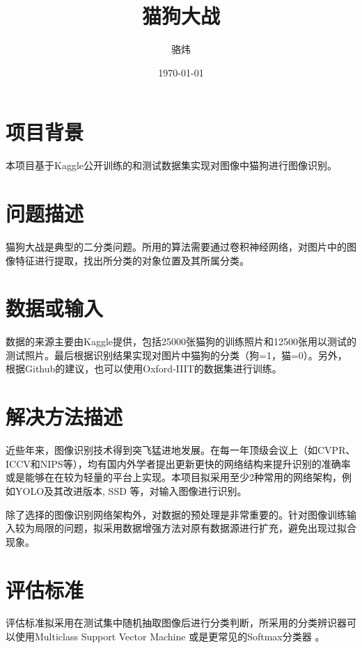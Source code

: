 \documentclass[a4paper,11pt]{article}
\author{骆炜}
\date{\today}
\title{猫狗大战}
\begin{document}
\maketitle
\tableofcontents


\section{项目背景}
\label{sec:org61c381c}
本项目基于Kaggle公开训练的和测试数据集实现对图像中猫狗进行图像识别。
\section{问题描述}
\label{sec:org3144931}
猫狗大战是典型的二分类问题。所用的算法需要通过卷积神经网络，对图片中的图像特征进行提取，找出所分类的对象位置及其所属分类。
\section{数据或输入}
\label{sec:orge54e3b4}
数据的来源主要由Kaggle提供，包括25000张猫狗的训练照片和12500张用以测试的测试照片。最后根据识别结果实现对图片中猫狗的分类（狗=1，猫=0）。另外，根据Github的建议，也可以使用Oxford-IIIT的数据集进行训练。
\section{解决方法描述}
\label{sec:org768782f}
近些年来，图像识别技术得到突飞猛进地发展。在每一年顶级会议上（如CVPR、ICCV和NIPS等），均有国内外学者提出更新更快的网络结构来提升识别的准确率或是能够在在较为轻量的平台上实现。本项目拟采用至少2种常用的网络架构，例如YOLO及其改进版本\cite{RedmonDivvalaGirshickFarhadi2016}, SSD \cite{LiuAnguelovErhanSzegedyReedFuBerg2016} 等，对输入图像进行识别。

除了选择的图像识别网络架构外，对数据的预处理是非常重要的。针对图像训练输入较为局限的问题，拟采用数据增强方法对原有数据源进行扩充，避免出现过拟合现象。
\section{评估标准}
\label{sec:orgfff231d}
评估标准拟采用在测试集中随机抽取图像后进行分类判断，所采用的分类辨识器可以使用Multiclass Support Vector Machine \cite{Kung2014} 或是更常见的Softmax分类器 \cite{QiWangLiu2017}。




\end{document}

